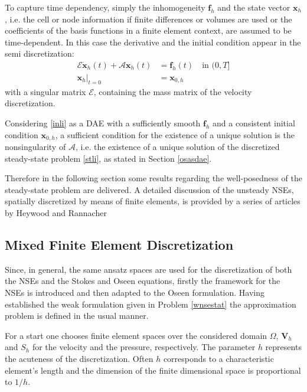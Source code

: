 \documentclass[a4paper,10pt,BCOR=15mm]{scrbook}
\begin{document}
To capture time dependency, simply the inhomogeneity $\mathbf f_h$ and the state vector $\mathbf x_h$, i.e. the cell or node information if finite differences or volumes are used or the coefficients of the basis functions in a finite element context, are assumed to be time-dependent. In this case the derivative and the initial condition appear in the semi discretization:
\begin{subequations}\label{inli}
\begin{align}
\mathcal E \dot{ \mathbf x} _h(t) + \mathcal A \mathbf x_h(t) &= \mathbf f_h(t) \quad \text{in } (0,T] \\ 
\mathbf x_h \vert _{t=0} &= \mathbf x _{0,h}
\end{align}
\end{subequations}
with a singular matrix $\mathcal E$, containing the mass matrix of the velocity discretization. 

Considering \eqref{inli} as a DAE with a sufficiently smooth $\mathbf f_h$ and a consistent initial condition $ \mathbf x _{0,h}$, a sufficient condition for the existence of a unique solution is the nonsingularity of $\mathcal A$, i.e. the existence of a unique solution of the discretized steady-state problem \eqref{stli}, as stated in Section \ref{osasdae}. 

Therefore in the following section some results regarding the well-posedness of the steady-state problem are delivered. A detailed discussion of the unsteady NSEs, spatially discretized by means of finite elements, is provided by a series of articles by Heywood and Rannacher \cite{hera1,hera2,hera3,hera4}


\subsection{Mixed Finite Element Discretization }\label{mfed}
Since, in general, the same ansatz spaces are used for the discretization of both the NSEs and the Stokes and Oseen equations, firstly the framework for the NSEs is introduced and then adapted to the Oseen formulation. Having established the weak formulation given in Problem \ref{wnsestat} the approximation problem is defined in the usual manner.

For a start one chooses finite element spaces over the considered domain $\Omega$, $\mathbf V_h$ and $S_h$ for the velocity and the pressure, respectively. The parameter $h$ represents the acuteness of the discretization. Often $h$ corresponds to a characteristic element's length and the dimension of the finite dimensional space is proportional to $1/h$.
\end{document}
